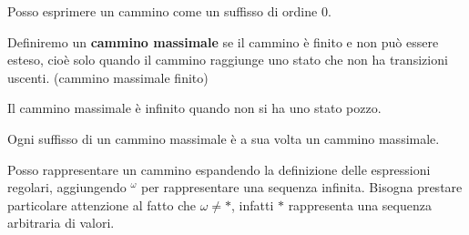 \begin{nota}
    Posso esprimere un cammino come un suffisso di ordine 0.
\end{nota}
\begin{definizione}
    Definiremo un \textbf{cammino massimale} se il cammino è finito e non può
    essere esteso, cioè solo quando il cammino raggiunge uno stato che non ha
    transizioni uscenti. (cammino massimale finito)
\end{definizione}
Il cammino massimale è infinito quando non si ha uno stato pozzo.
\begin{nota}
    Ogni suffisso di un cammino massimale è a sua volta un cammino massimale.
\end{nota}
Posso rappresentare un cammino espandendo la definizione delle espressioni
regolari, aggiungendo $^\omega$ per rappresentare una sequenza infinita. Bisogna
prestare particolare attenzione al fatto che $\omega \neq \ast$, infatti $\ast$
rappresenta una sequenza arbitraria di valori.
